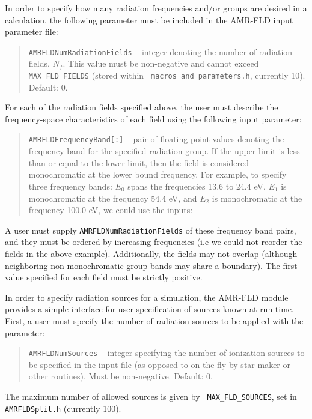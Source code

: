 \documentclass[10pt]{article}
\renewcommand{\(}{\left(}
\renewcommand{\)}{\right)}
\begin{document}
In order to specify how many radiation frequencies and/or groups are
desired in a calculation, the following parameter must be included in
the AMR-FLD input parameter file:
%
\blockquote{{\tt AMRFLDNumRadiationFields} -- integer denoting the
  number of radiation fields, $N_f$.  This value must be non-negative
  and cannot exceed {\tt MAX\_FLD\_FIELDS} (stored within {\tt
  macros\_and\_parameters.h}, currently 10).  Default: 0.} 
%
For each of the radiation fields specified above, the user must
describe the frequency-space characteristics of each field using the
following input parameter:
%
\blockquote{{\tt AMRFLDFrequencyBand[:]}  -- pair of floating-point values
  denoting the frequency band for the specified radiation group.  If
  the upper limit is less than or equal to the lower limit, then the
  field is considered monochromatic at the lower bound frequency.  For
  example, to specify three frequency bands: $E_0$ spans the
  frequencies 13.6 to 24.4 eV, $E_1$ is monochromatic at the frequency
  54.4 eV, and $E_2$ is monochromatic at the frequency 100.0 eV, we
  could use the inputs:

  \hspace{2.0cm}{\tt AMRFLDFrequencyBand[0] = 13.6 24.4}

  \vspace{-0.25cm}
  \hspace{2.0cm}{\tt AMRFLDFrequencyBand[1] = 54.4 54.4}

  \vspace{-0.25cm}
  \hspace{2.0cm}{\tt AMRFLDFrequencyBand[2] = 100.0 99.0}}
%
A user must supply {\tt AMRFLDNumRadiationFields} of these frequency
band pairs, and they must be ordered by increasing frequencies (i.e we
could not reorder the fields in the above example).  Additionally, the
fields may not overlap (although neighboring non-monochromatic group
bands may share a boundary).  The first value specified for each field
must be strictly positive. 



In order to specify radiation sources for a simulation, the AMR-FLD
module provides a simple interface for user specification of sources
known at run-time.  First, a user must specify the number of radiation
sources to be applied with the parameter:
%
\blockquote{{\tt AMRFLDNumSources} -- integer specifying the number of
  ionization sources to be specified in the input file (as opposed to
  on-the-fly by star-maker or other routines).  Must be
  non-negative. Default: 0.}
%
The maximum number of allowed sources is given by {\tt
MAX\_FLD\_SOURCES}, set in {\tt AMRFLDSplit.h} (currently 100).
\end{document}
